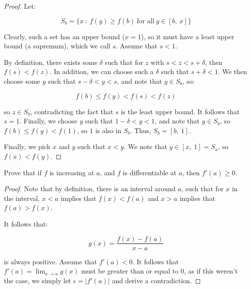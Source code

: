 \documentclass[10pt, oneside]{amsart}
\newenvironment{problem}[2][Problem]{\begin{trivlist}
\item[\hskip \labelsep {\bfseries #1}\hskip \labelsep {\bfseries #2.}]}{\end{trivlist}}
\begin{document}
    \begin{proof}
      Let:

      $$S_b = \{x \ : \ f(y) \geq f(b) \ \text{for all} \ y \in [b, \ x]\}$$

      Clearly, such a set has an upper bound ($x = 1$), so it must have a least upper bound (a supremum), which we call $s$. Assume that $s < 1$.
      \newline

      By definition, there exists some $\delta$ such that for $z$ with $s < z < s + \delta$, then $f(s) < f(z)$. In addition, we can choose such a $\delta$
      such that $s + \delta < 1$. We then choose some $y$ such that $s - \delta < y < s$, and note that $y \in S_b$, so:

      $$f(b) \leq f(y) < f(s) < f(z)$$

      so $z \in S_b$, contradicting the fact that $s$ is the least upper bound. It follows that $s = 1$. Finally, we choose $y$ such that $1 - \delta < y < 1$,
      and note that $y \in S_b$, so $f(b) \leq f(y) < f(1)$, so $1$ is also in $S_b$. Thus, $S_b = [b, \ 1]$.
        \newline

       Finally, we pick $x$ and $y$ such that $x < y$. We note that $y \in [x, \ 1] = S_x$, so $f(x) < f(y)$. 
      
    \end{proof}

    \begin{problem}{11.65c}
      Prove that if $f$ is increasing at $a$, and $f$ is differentiable at $a$, then $f'(a) \geq 0$.
    \end{problem}

    \begin{proof}
      Note that by definition, there is an interval around $a$, such that for $x$ in the interval, $x < a$ implies that $f(x) < f(a)$ and $x > a$ implies that $f(a) > f(x)$.
      \newline

      It follows that:

      $$g(x) = \frac{f(x) - f(a)}{x - a}$$

      is always positive. Assume that $f'(a) < 0$. It follows that $f'(a) = \lim_{x \to a} g(x)$ must be greater than or equal to $0$, as if this weren't the case,
      we simply let $\epsilon = |f'(a)|$ and derive a contradiction.
    \end{proof}
\end{document}
